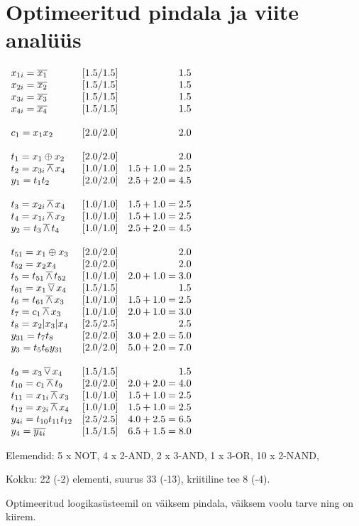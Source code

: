\section{Optimeeritud pindala ja viite analüüs}

\(\begin{array}{l r r}
x_{1i} = \mathop{\overline{x_1}} & [1.5/1.5] & 1.5\\
x_{2i} = \mathop{\overline{x_2}} & [1.5/1.5] & 1.5 \\
x_{3i} = \mathop{\overline{x_3}} & [1.5/1.5] & 1.5 \\
x_{4i} = \mathop{\overline{x_4}} & [1.5/1.5] & 1.5 \\
\\
c_1 = x_1 x_2 & [2.0/2.0] & 2.0\\ 
\\
t_1 = x_1  \oplus  x_2 & [2.0/2.0] & 2.0\\
t_2 = x_{3i} \mathop{\overline{\wedge}} x_4 & [1.0/1.0] & 1.5+1.0=2.5\\
y_1 =  t_1  t_2 & [2.0/2.0] & 2.5+2.0=4.5 \\
\\
t_3 = x_{2i} \mathop{\overline{\wedge}} x_4 & [1.0/1.0] & 1.5+1.0=2.5\\
t_4 = x_{1i} \mathop{\overline{\wedge}} x_2 & [1.0/1.0] & 1.5+1.0=2.5\\
y_2 = t_3 \mathop{\overline{\wedge}} t_4 & [1.0/1.0] & 2.5+2.0=4.5 \\
\\
t_{51} = x_1 \oplus x_3 & [2.0/2.0] & 2.0\\
t_{52} = x_2 x_4 & [2.0/2.0] & 2.0\\
t_5 = t_{51} \mathop{\overline{\wedge}} t_{52} & [1.0/1.0] & 2.0+1.0=3.0\\
t_{61} = x_1 \mathop{\overline{\vee}} x_4 & [1.5/1.5] & 1.5\\
t_6 = t_{61} \mathop{\overline{\wedge}} x_3 & [1.0/1.0] & 1.5+1.0=2.5 \\
t_7 = c_1 \mathop{\overline{\wedge}} x_3 & [1.0/1.0] & 2.0+1.0=3.0\\
t_8 = x_2 | x_3 | x_4 & [2.5/2.5] & 2.5\\
y_{31} = t_7  t_8 & [2.0/2.0] & 3.0+2.0 = 5.0\\
y_3 = t_5 t_6 y_{31} & [2.0/2.0] & 5.0+2.0=7.0\\
\\
t_9 = x_3 \mathop{\overline{\vee}} x_4 & [1.5/1.5] & 1.5\\
t_{10} = c_1 \mathop{\overline{\wedge}} t_9 & [2.0/2.0] & 2.0+2.0=4.0 \\
t_{11} = x_{1i} \mathop{\overline{\wedge}} x_3 & [1.0/1.0] & 1.5+1.0=2.5 \\
t_{12} = x_{2i} \mathop{\overline{\wedge}} x_4 & [1.0/1.0] & 1.5+1.0=2.5\\ 
y_{4i} = t_{10}  t_{11}  t_{12} & [2.5/2.5] & 4.0+2.5=6.5 \\
y_4 = \mathop{\overline{y_{4i}}} & [1.5/1.5] & 6.5+1.5=8.0\\
\end{array}\)

Elemendid: 5 x NOT, 4 x 2-AND, 2 x 3-AND, 1 x 3-OR, 10 x 2-NAND, 

Kokku: 22 (-2) elementi, suurus 33 (-13), kriitiline tee 8 (-4).

Optimeeritud loogikasüsteemil on väiksem pindala, väiksem voolu tarve ning on kiirem.